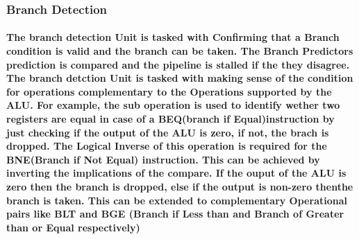 \documentclass[12pt,a4paper]{report}
\begin{document}
\subsubsection{Branch Detection}
\paragraph{\textrm{\textmd{The branch detection Unit is tasked with Confirming that a Branch condition is valid and the branch can be taken. The Branch Predictors prediction is compared and the pipeline is stalled if the they disagree. The branch detction Unit is tasked with making sense of the condition for operations complementary to the Operations supported by the ALU. For example, the sub operation is used to identify wether two registers are equal in case of a BEQ(branch if Equal)instruction by just checking if the output of the ALU is zero, if not,  the  brach is dropped. The Logical Inverse of this operation is required for the BNE(Branch if Not Equal) instruction. This can be achieved by inverting the implications of the compare. If the ouput of the ALU is zero then the branch is dropped, else if the output is non-zero thenthe branch is taken. This can be extended to complementary Operational pairs like BLT and BGE (Branch if Less than and Branch of Greater than or Equal respectively) }}}


\end{document}
